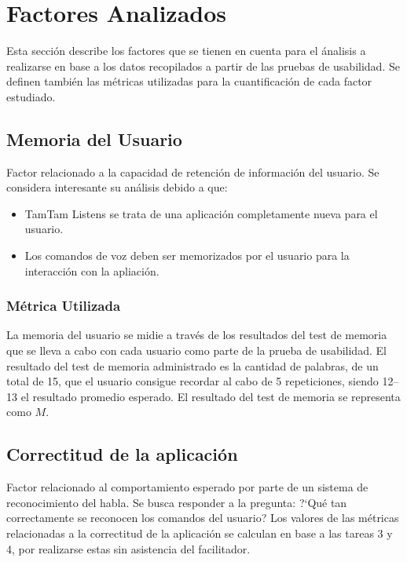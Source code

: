 \section{Factores Analizados}
\label{sec:factores}

Esta secci\'on describe los factores que se tienen en cuenta para el \'analisis a realizarse
en base a los datos recopilados a partir de las pruebas de usabilidad.
Se definen tambi\'en las m\'etricas utilizadas para la cuantificaci\'on de cada factor estudiado.

\subsection{Memoria del Usuario}
\label{sec:memoria-del-usuario}
Factor relacionado a la capacidad de retenci\'on de informaci\'on del usuario.
Se considera interesante su an\'alisis debido a que:
\begin{itemize}
	\item TamTam Listens se trata de una aplicaci\'on completamente nueva para el usuario.
	\item Los comandos de voz deben ser memorizados por el usuario para la interacci\'on con
	la apliaci\'on.
\end{itemize}
\subsubsection{M\'etrica Utilizada}
La memoria del usuario se midie a trav\'es de los resultados del test de memoria que se lleva
a cabo con cada usuario como parte de la prueba de usabilidad.
El resultado del test de memoria administrado es la cantidad de palabras, de un total de 15,
que el usuario consigue recordar al cabo de 5 repeticiones, siendo 12--13 el resultado promedio
esperado. El resultado del test de memoria se representa como $M$.

\subsection{Correctitud de la aplicaci\'on}
Factor relacionado al comportamiento esperado por parte de un sistema de reconocimiento del
habla. Se busca responder a la pregunta: {?`}Qu\'e tan correctamente se reconocen los comandos 
del usuario?
Los valores de las m\'etricas relacionadas a la correctitud de la aplicaci\'on se calculan
en base a las tareas 3 y 4, por realizarse estas sin asistencia del facilitador.  
